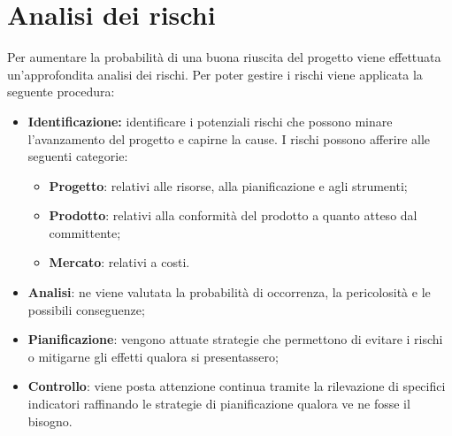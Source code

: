 \chapter{Analisi dei rischi}
Per aumentare la probabilità di una buona riuscita del progetto viene effettuata un'approfondita analisi dei rischi. Per poter gestire i rischi viene applicata la seguente procedura:
\begin{itemize}
		\item \textbf{Identificazione:} identificare i potenziali rischi che possono minare l'avanzamento del progetto e capirne la cause. I rischi possono afferire alle seguenti categorie:
		\begin{itemize}
			\item \textbf{Progetto}: relativi alle risorse, alla pianificazione e agli strumenti;
			\item \textbf{Prodotto}: relativi alla conformità del prodotto a quanto atteso dal committente;
			\item \textbf{Mercato}: relativi a costi.
		\end{itemize}
		\item \textbf{Analisi}: ne viene valutata la probabilità di occorrenza, la pericolosità e le possibili conseguenze;
		\item \textbf{Pianificazione}: vengono attuate strategie che permettono di evitare i rischi o mitigarne gli effetti qualora si presentassero;
		\item \textbf{Controllo}: viene posta attenzione continua tramite la rilevazione di specifici indicatori raffinando le strategie di pianificazione qualora ve ne fosse il bisogno.
\end{itemize}
